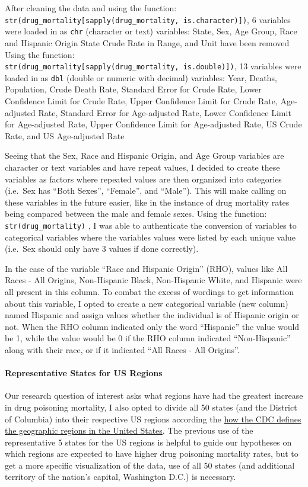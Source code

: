 \documentclass[
]{article}
\begin{document}
After cleaning the data and using the function:
\texttt{str(drug\_mortality{[}sapply(drug\_mortality,\ is.character){]})},
6 variables were loaded in as \texttt{chr} (character or text)
variables: State, Sex, Age Group, Race and Hispanic Origin State Crude
Rate in Range, and Unit have been removed Using the function:
\texttt{str(drug\_mortality{[}sapply(drug\_mortality,\ is.double){]})},
13 variables were loaded in as \texttt{dbl} (double or numeric with
decimal) variables: Year, Deaths, Population, Crude Death Rate, Standard
Error for Crude Rate, Lower Confidence Limit for Crude Rate, Upper
Confidence Limit for Crude Rate, Age-adjusted Rate, Standard Error for
Age-adjusted Rate, Lower Confidence Limit for Age-adjusted Rate, Upper
Confidence Limit for Age-adjusted Rate, US Crude Rate, and US
Age-adjusted Rate

Seeing that the Sex, Race and Hispanic Origin, and Age Group variables
are character or text variables and have repeat values, I decided to
create these variables as factors where repeated values are then
organized into categories (i.e.~Sex has ``Both Sexes'', ``Female'', and
``Male''). This will make calling on these variables in the future
easier, like in the instance of drug mortality rates being compared
between the male and female sexes. Using the function:
\texttt{str(drug\_mortality)} , I was able to authenticate the
conversion of variables to categorical variables where the variables
values were listed by each unique value (i.e.~Sex should only have 3
values if done correctly).

In the case of the variable ``Race and Hispanic Origin'' (RHO), values
like All Races - All Origins, Non-Hispanic Black, Non-Hispanic White,
and Hispanic were all present in this column. To combat the excess of
wordings to get information about this variable, I opted to create a new
categorical variable (new column) named Hispanic and assign values
whether the individual is of Hispanic origin or not. When the RHO column
indicated only the word ``Hispanic'' the value would be 1, while the
value would be 0 if the RHO column indicated ``Non-Hispanic'' along with
their race, or if it indicated ``All Races - All Origins''.

\paragraph{Representative States for US
Regions}\label{representative-states-for-us-regions}

Our research question of interest asks what regions have had the
greatest increase in drug poisoning mortality, I also opted to divide
all 50 states (and the District of Columbia) into their respective US
regions according the
\href{https://www.cdc.gov/nchs/hus/sources-definitions/geographic-region.htm}{how
the CDC defines the geographic regions in the United States}. The
previous use of the representative 5 states for the US regions is
helpful to guide our hypotheses on which regions are expected to have
higher drug poisoning mortality rates, but to get a more specific
visualization of the data, use of all 50 states (and additional
territory of the nation's capital, Washington D.C.) is necessary.
\end{document}
